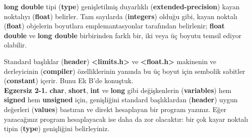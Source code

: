 \documentclass[a4paper,12pt,oneside]{book}
\begin{document}
\par \textbf{long double} tipi (\textbf{type}) genişletilmiş duyarlıklı (\textbf{extended-precision}) kayan noktalıyı (\textbf{float}) belirler. Tam sayılarda (\textbf{integers}) olduğu gibi, kayan noktalı (\textbf{float}) objelerin boyutlara emplemantasyonlar tarafından belirlenir; \textbf{float} \textbf{double} ve \textbf{long double} birbirinden farklı bir, iki veya üç boyutu temsil ediyor olabilir.
\par Standard başlıklar (\textbf{header})  \textbf{<limits.h>} ve \textbf{<float.h>}  makinenin ve derleyicinin (\textbf{compiler}) özelliklerinin yanında bu üç boyut için sembolik sabitler (\textbf{constant}) içerir. Bunu Ek B'de konuştuk. \\

\noindent \textbf{Egzersiz 2-1.} \textbf{char}, \textbf{short}, \textbf{int} ve \textbf{long} gibi değişkenlerin (\textbf{variables}) hem \textbf{signed} hem \textbf{unsigned} için, genişliğini standard başlıklardan (\textbf{header}) uygun değerleri (\textbf{values}) bastıran ve direkt hesaplayan bir program yazınız. Eğer yazacağınız program hesaplayacak ise daha da zor olacaktır: bir çok kayar noktalı tipin (\textbf{type}) genişliğini belirleyiniz.
\end{document}

